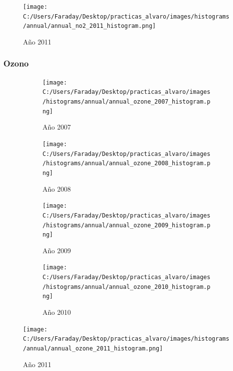 \documentclass[12pt]{article}
\begin{document}
\begin{figure}[H]
\centering
\texttt{[image: C:/Users/Faraday/Desktop/practicas\_alvaro/images/histograms/annual/annual\_no2\_2011\_histogram.png]}
\label{fig:hist-ann-1-5}
\caption{Año 2011}
\end{figure}

\newpage

\subsubsection*{Ozono}
%

\begin{figure}[H]
\centering
\begin{subfigure}[h]{0.45\textwidth}
\texttt{[image: C:/Users/Faraday/Desktop/practicas\_alvaro/images/histograms/annual/annual\_ozone\_2007\_histogram.png]}
\caption{Año 2007}
\label{fig:hist-ann-2-1}
\end{subfigure}
%
\begin{subfigure}[H]{0.45\textwidth}
\texttt{[image: C:/Users/Faraday/Desktop/practicas\_alvaro/images/histograms/annual/annual\_ozone\_2008\_histogram.png]}
\caption{Año 2008}
\label{fig:hist-ann-2-2}
\end{subfigure}
\caption{}
\end{figure}

\begin{figure}[H]
\centering
\begin{subfigure}[h]{0.45\textwidth}
\texttt{[image: C:/Users/Faraday/Desktop/practicas\_alvaro/images/histograms/annual/annual\_ozone\_2009\_histogram.png]}
\caption{Año 2009}
\label{fig:hist-ann-2-3}
\end{subfigure}
%
\begin{subfigure}[H]{0.45\textwidth}
\texttt{[image: C:/Users/Faraday/Desktop/practicas\_alvaro/images/histograms/annual/annual\_ozone\_2010\_histogram.png]}
\caption{Año 2010}
\label{fig:hist-ann-2-4}
\end{subfigure}
\caption{}
\end{figure}

\begin{figure}[H]
\centering
\texttt{[image: C:/Users/Faraday/Desktop/practicas\_alvaro/images/histograms/annual/annual\_ozone\_2011\_histogram.png]}
\label{fig:hist-ann-2-5}
\caption{Año 2011}
\end{figure}

\newpage
\end{document}
